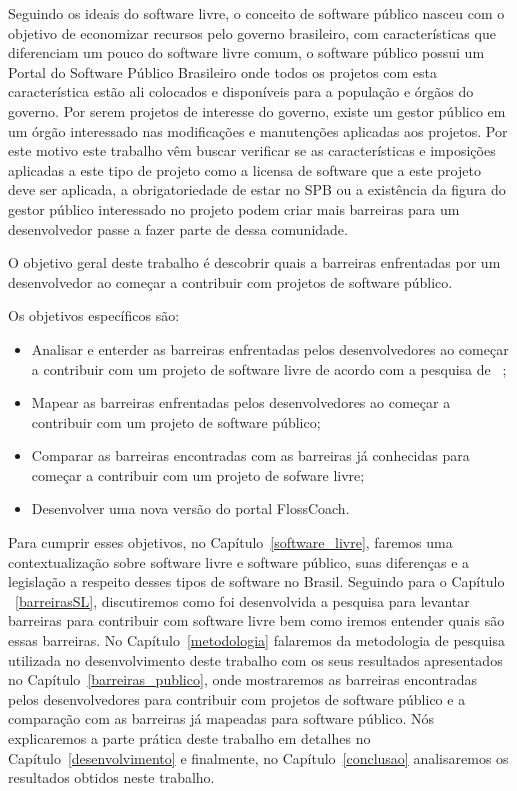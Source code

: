Seguindo os ideais do software livre, o conceito de software público nasceu com o
objetivo de economizar recursos pelo governo brasileiro, com características que 
diferenciam um pouco do software livre comum, o software público possui um
Portal do Software Público Brasileiro onde todos os projetos com esta característica
estão ali colocados e disponíveis para a população e órgãos do governo. Por serem
projetos de interesse do governo, existe um gestor público em um órgão interessado 
nas modificações e manutenções aplicadas aos projetos. Por este motivo este trabalho 
vêm buscar verificar se as características e imposições aplicadas a este tipo de projeto 
como a licensa de software que a este projeto deve ser aplicada, a obrigatoriedade de
estar no SPB ou a existência da figura do gestor público interessado no projeto podem
criar mais barreiras para um desenvolvedor passe a fazer parte de dessa comunidade.


O objetivo geral deste trabalho é descobrir quais a barreiras enfrentadas por um 
desenvolvedor ao começar a contribuir com projetos de software público.

Os objetivos específicos são:

\begin{itemize}
\item Analisar e enterder as barreiras enfrentadas pelos desenvolvedores ao começar
a contribuir com um projeto de software livre de acordo com a pesquisa de ~;
\item Mapear as barreiras enfrentadas pelos desenvolvedores ao começar a contribuir
com um projeto de software público;
\item Comparar as barreiras encontradas com as barreiras já conhecidas para começar 
a contribuir com um projeto de sofware livre;
\item Desenvolver uma nova versão do portal FlossCoach.
\end{itemize}

Para cumprir esses objetivos, no Capítulo~\ref{software_livre}, faremos uma 
contextualização sobre software livre e software público, suas diferenças e a 
legislação a respeito desses tipos de software no Brasil. Seguindo para o Capítulo
~\ref{barreirasSL}, discutiremos como foi desenvolvida a pesquisa para levantar
barreiras para contribuir com software livre bem como iremos entender quais são
essas barreiras. No Capítulo~\ref{metodologia} falaremos da metodologia de pesquisa
utilizada no desenvolvimento deste trabalho com os seus resultados apresentados no
Capítulo~\ref{barreiras_publico}, onde mostraremos as barreiras encontradas pelos
desenvolvedores para contribuir com projetos de software público e a comparação com 
as barreiras já mapeadas para software público. Nós explicaremos a parte prática deste
trabalho em detalhes no Capítulo~\ref{desenvolvimento} e finalmente, no Capítulo~\ref{conclusao}
analisaremos os resultados obtidos neste trabalho.


